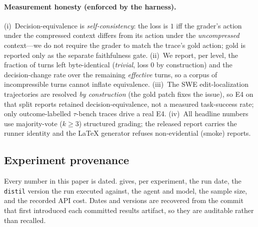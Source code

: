 \documentclass[11pt]{article}
\begin{document}
\paragraph{Measurement honesty (enforced by the harness).} (i)~Decision-equivalence
is \emph{self-consistency}: the loss is $1$ iff the grader's action under the
compressed context differs from its action under the \emph{uncompressed} context---we
do not require the grader to match the trace's gold action; gold is reported only as
the separate faithfulness gate. (ii)~We report, per level, the fraction of turns left
byte-identical (\emph{trivial}, loss $0$ by construction) and the decision-change rate
over the remaining \emph{effective} turns, so a corpus of incompressible turns cannot
inflate equivalence. (iii)~The SWE edit-localization trajectories are resolved
\emph{by construction} (the gold patch fixes the issue), so E4 on that split reports
retained decision-equivalence, not a measured task-success rate; only
outcome-labelled $\tau$-bench traces drive a real E4. (iv)~All headline
numbers use majority-vote ($k{\ge}3$) structured grading; the released report carries
the runner identity and the LaTeX generator refuses non-evidential (smoke) reports.

\subsection{Experiment provenance}
\label{sec:provenance}

Every number in this paper is dated.  gives, per experiment, the run
date, the \texttt{distil} version the run executed against, the agent and model, the sample
size, and the recorded API cost. Dates and versions are recovered from the commit that
first introduced each committed results artifact, so they are auditable rather than
recalled.
\end{document}
